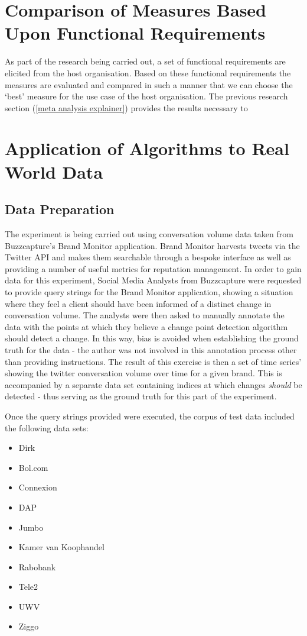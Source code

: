 \documentclass{uvamscse}	%
\begin{document}
\section{Comparison of Measures Based Upon Functional Requirements}

As part of the research being carried out, a set of functional requirements are elicited from the host organisation. Based on these functional requirements the measures are evaluated and compared in such a manner that we can choose the `best' measure for the use case of the host organisation. The previous research section (\autoref{meta analysis explainer}) provides the results necessary to 

\section{Application of Algorithms to Real World Data}

\subsection{Data Preparation}

The experiment is being carried out using conversation volume data taken from Buzzcapture's Brand Monitor application. Brand Monitor harvests tweets via the Twitter API and makes them searchable through a bespoke interface as well as providing a number of useful metrics for reputation management. In order to gain data for this experiment, Social Media Analysts from Buzzcapture were requested to provide query strings for the Brand Monitor application, showing a situation where they feel a client should have been informed of a distinct change in conversation volume. The analysts were then asked to manually annotate the data with the points at which they believe a change point detection algorithm should detect a change. In this way, bias is avoided when establishing the ground truth for the data - the author was not involved in this annotation process other than providing instructions. The result of this exercise is then a set of time series' showing the twitter conversation volume over time for a given brand. This is accompanied by a separate data set containing indices at which changes \emph{should} be detected - thus serving as the ground truth for this part of the experiment.

Once the query strings provided were executed, the corpus of test data included the following data sets:

\begin{itemize}
    \item Dirk
    \item Bol.com
    \item Connexion
    \item DAP
    \item Jumbo
    \item Kamer van Koophandel
    \item Rabobank
    \item Tele2
    \item UWV
    \item Ziggo
\end{itemize}
\end{document}
